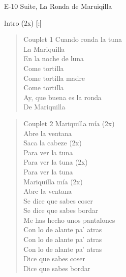 \begin{song}[vals]{E-10 Suite, La Ronda de Maruiqilla}
\begin{instrumental}{Intro (2x)}
       [:] \measure{}   
\end{instrumental}

\begin{verse}{Couplet 1}
Cuando ronda la tuna\\
La Mariquilla\\
\chord{}En la noche de luna\\
Come tortilla\\
\chord{}Come tortilla madre\\
Come tortilla\\
\chord{}Ay, que buena es la ronda\\
De Mariquilla\\
\end{verse}

\begin{verse}{Couplet 2}
\chord{}Mariquilla mía (2x)\\
Abre la ventana\\
\chord{}Saca la cabeze (2x) \\
Para ver la tuna\\
\chord{}Para ver la tuna (2x)\\
Para ver la tuna\\
\chord{}Mariquilla mía (2x)\\
Abre la ventana\\
\chord{}Se dice que sabes coser \hspace{1em} \\
\chord{}Se dice que sabes bordar \hspace{1em} \\
\chord{}Me has hecho unos pantalones\\
Con lo de alante pa' atras\\
\chord{}Con lo de alante pa' atras\hspace{1em} \\
\chord{}Con lo de alante pa' atras\hspace{1em} \\
\chord{}Dice que sabes coser\\
Dice que sabes bordar\\
\end{verse}


\end{song}
